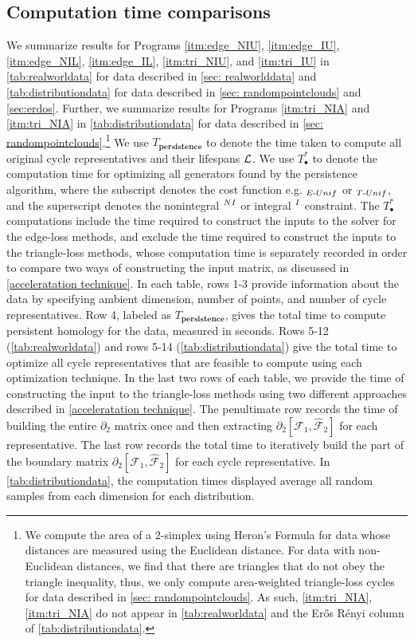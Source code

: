 \subsection{Computation time comparisons} 
\label{sec:timecomparisons}

We summarize results for Programs \ref{itm:edge_NIU}, \ref{itm:edge_IU}, \ref{itm:edge_NIL},
\ref{itm:edge_IL},
\ref{itm:tri_NIU}, and 
\ref{itm:tri_IU} in \tab \ref{tab:realworldata} for data described in \se \ref{sec: realworlddata} and \tab \ref{tab:distributiondata} for data described in \se \ref{sec: randompointclouds} and \se \ref{sec:erdos}. Further, we summarize results for Programs \ref{itm:tri_NIA} and \ref{itm:tri_NIA} in \tab \ref{tab:distributiondata} for data described in \se \ref{sec: randompointclouds}.\footnote{We compute the area of a $2$-simplex using Heron's Formula for data whose distances are measured using the Euclidean distance. For data with non-Euclidean distances, we find that there are triangles that do not obey the triangle inequality, thus, we only compute area-weighted triangle-loss cycles for data described in \se \ref{sec: randompointclouds}. As such,  \ref{itm:tri_NIA}, 
\ref{itm:tri_NIA} do not appear in \tab \ref{tab:realworldata} and the Er\H{o}s R\'enyi column of \tab \ref{tab:distributiondata}.}
We use $T_\textbf{persistence}$ to denote the time taken to compute all original cycle representatives and their lifespans $\mathcal{L}$. We use $T_\bullet^*$ to denote the computation time for optimizing all generators found by the persistence algorithm, where the subscript denotes the cost function e.g. $_{E\text{-}Unif}$ or $_{T\text{-}Unif}$, and the superscript denotes the nonintegral $^{NI}$ or integral $^I$ constraint. 
The $T_\bullet^*$ computations include the time required to construct the inputs to the solver for the edge-loss methods, and exclude the time required to construct the inputs to the triangle-loss methods, whose computation time is separately recorded in order to compare two ways of constructing the input matrix, as discussed in \se \ref{acceleratation technique}. In each table, rows 1-3 provide information about the data by specifying ambient dimension, number of points, and number of cycle representatives. Row 4, labeled as $T_\textbf{persistence}$, gives the total time to compute persistent homology for the data, measured in seconds. Rows 5-12 (\tab \ref{tab:realworldata}) and rows 5-14 (\tab \ref{tab:distributiondata}) give the total time to optimize all cycle representatives that are feasible to compute using each optimization technique. In the last two rows of each table, we provide the time of constructing the input to the triangle-loss methods using two different approaches described in \se \ref{acceleratation technique}. The penultimate row records the time of building the entire $\partial_{2}$ matrix once and then extracting $\partial_2[\mathcal{F}_1, \hat {\mathcal{F}}_{2}]$ for each representative. The last row records the total time to iteratively build the part of the boundary matrix $\partial_{2}[ \mathcal{F}_1 , \hat {\mathcal{F}}_{2} ]$ for each cycle representative. In \tab \ref{tab:distributiondata}, the computation times displayed average all random samples from each dimension for each distribution. 

